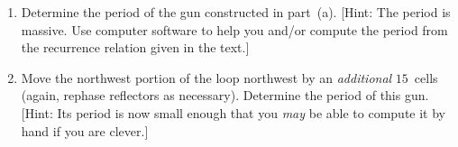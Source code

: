 \begin{multicols}{2}
\begin{problemstar}
\begin{enumerate}[label=\bf\color{ocre}(\alph*)]
			\item {} Determine the period of the gun constructed in part~(a). [Hint: The period is massive. Use computer software to help you and/or compute the period from the recurrence relation given in the text.]
			
			\item {} Move the northwest portion of the loop northwest by an \emph{additional} $15$~cells (again, rephase reflectors as necessary). Determine the period of this gun. [Hint: Its period is now small enough that you \emph{may} be able to compute it by hand if you are clever.]
		\end{enumerate}
	\end{problemstar}
	
	
	
	
	
	
\end{multicols}
\normalsize\vspace*{0.01cm}

